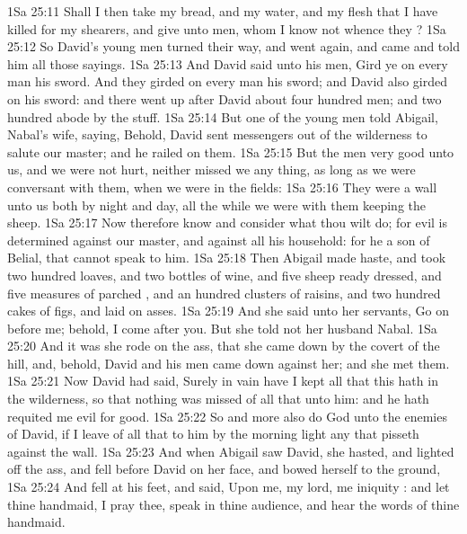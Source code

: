 \vs 1Sa 25:11 Shall I then take my bread, and my water, and my flesh that I have killed for my shearers, and give  unto men, whom I know not whence they ?
\vs 1Sa 25:12 So David's young men turned their way, and went again, and came and told him all those sayings.
\vs 1Sa 25:13 And David said unto his men, Gird ye on every man his sword. And they girded on every man his sword; and David also girded on his sword: and there went up after David about four hundred men; and two hundred abode by the stuff.
\vs 1Sa 25:14 But one of the young men told Abigail, Nabal's wife, saying, Behold, David sent messengers out of the wilderness to salute our master; and he railed on them.
\vs 1Sa 25:15 But the men  very good unto us, and we were not hurt, neither missed we any thing, as long as we were conversant with them, when we were in the fields:
\vs 1Sa 25:16 They were a wall unto us both by night and day, all the while we were with them keeping the sheep.
\vs 1Sa 25:17 Now therefore know and consider what thou wilt do; for evil is determined against our master, and against all his household: for he  a son of Belial, that  cannot speak to him.
\vs 1Sa 25:18 Then Abigail made haste, and took two hundred loaves, and two bottles of wine, and five sheep ready dressed, and five measures of parched , and an hundred clusters of raisins, and two hundred cakes of figs, and laid  on asses.
\vs 1Sa 25:19 And she said unto her servants, Go on before me; behold, I come after you. But she told not her husband Nabal.
\vs 1Sa 25:20 And it was  she rode on the ass, that she came down by the covert of the hill, and, behold, David and his men came down against her; and she met them.
\vs 1Sa 25:21 Now David had said, Surely in vain have I kept all that this  hath in the wilderness, so that nothing was missed of all that  unto him: and he hath requited me evil for good.
\vs 1Sa 25:22 So and more also do God unto the enemies of David, if I leave of all that  to him by the morning light any that pisseth against the wall.
\vs 1Sa 25:23 And when Abigail saw David, she hasted, and lighted off the ass, and fell before David on her face, and bowed herself to the ground,
\vs 1Sa 25:24 And fell at his feet, and said, Upon me, my lord,  me  iniquity : and let thine handmaid, I pray thee, speak in thine audience, and hear the words of thine handmaid.
